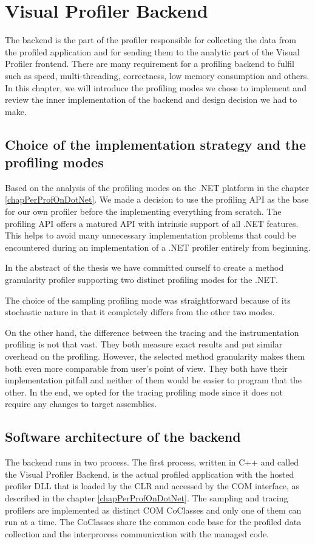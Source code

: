 \chapter{Visual Profiler Backend}
The backend is the part of the profiler responsible for collecting the data from the profiled application and for sending them to the analytic part of the Visual Profiler frontend. There are many requirement for a profiling backend to fulfil such as speed, multi-threading, correctness, low memory consumption and others. In this chapter, we will introduce the profiling modes we chose to implement and review the inner implementation of the backend and design decision we had to make.

\section{Choice of the implementation strategy and the profiling modes}
Based on the analysis of the profiling modes on the .NET platform in the chapter \ref{chapPerProfOnDotNet}. We made a decision to use the profiling API as the base for our own profiler before the implementing everything from scratch. The profiling API offers a 	 matured API with intrinsic support of all .NET features. This helps to avoid many unnecessary implementation problems that could be encountered during an implementation of a .NET profiler entirely from beginning.

In the abstract of the thesis we have committed ourself to create a method granularity profiler supporting two distinct profiling modes for the .NET.

The choice of the sampling profiling mode was straightforward because of its stochastic nature in that it completely differs from the other two modes. 

On the other hand, the difference between the tracing and the instrumentation profiling is not that vast. They both measure exact results and put similar overhead on the profiling. However, the selected method granularity makes them both even more comparable from user's point of view. They both have their implementation pitfall and neither of them would be easier to program that the other. In the end, we opted for the tracing profiling mode since it does not require any changes to target assemblies.

\section{Software architecture of the backend }
The backend runs in two process. The first process, written in C++ and called the Visual Profiler Backend, is the actual profiled application with the hosted profiler DLL that is loaded by the CLR and accessed by the COM interface, as described in the chapter \ref{chapPerProfOnDotNet}. The sampling and tracing profilers are implemented as distinct COM CoClasses and only one of them can run at a time. The CoClasses share the common code base for the profiled data collection and the interprocess communication with the managed code.

